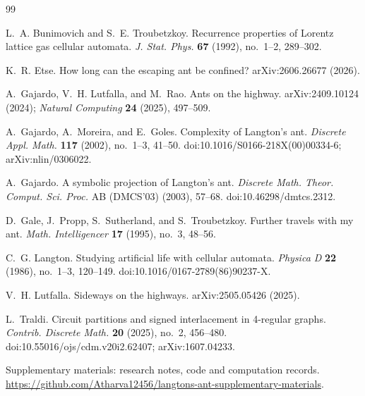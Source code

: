 \documentclass[11pt,letterpaper]{article}
\begin{document}
\begin{thebibliography}{99}

L.~A. Bunimovich and S.~E. Troubetzkoy.
\newblock Recurrence properties of {L}orentz lattice gas cellular automata.
\newblock \emph{J. Stat. Phys.} \textbf{67} (1992), no.~1--2, 289--302.

K.~R. Etse.
\newblock How long can the escaping ant be confined?
\newblock arXiv:2606.26677 (2026).

A.~Gajardo, V.~H. Lutfalla, and M.~Rao.
\newblock Ants on the highway.
\newblock arXiv:2409.10124 (2024); \emph{Natural Computing} \textbf{24} (2025), 497--509.

A.~Gajardo, A.~Moreira, and E.~Goles.
\newblock Complexity of {L}angton's ant.
\newblock \emph{Discrete Appl. Math.} \textbf{117} (2002), no.~1--3, 41--50.
\newblock doi:10.1016/S0166-218X(00)00334-6; arXiv:nlin/0306022.

A.~Gajardo.
\newblock A symbolic projection of {L}angton's ant.
\newblock \emph{Discrete Math. Theor. Comput. Sci. Proc.} AB (DMCS'03)
  (2003), 57--68.
\newblock doi:10.46298/dmtcs.2312.

D.~Gale, J.~Propp, S.~Sutherland, and S.~Troubetzkoy.
\newblock Further travels with my ant.
\newblock \emph{Math. Intelligencer} \textbf{17} (1995), no.~3, 48--56.

C.~G. Langton.
\newblock Studying artificial life with cellular automata.
\newblock \emph{Physica D} \textbf{22} (1986), no.~1--3, 120--149.
\newblock doi:10.1016/0167-2789(86)90237-X.

V.~H. Lutfalla.
\newblock Sideways on the highways.
\newblock arXiv:2505.05426 (2025).

L.~Traldi.
\newblock Circuit partitions and signed interlacement in 4-regular graphs.
\newblock \emph{Contrib. Discrete Math.} \textbf{20} (2025), no.~2, 456--480.
\newblock doi:10.55016/ojs/cdm.v20i2.62407; arXiv:1607.04233.

Supplementary materials: research notes, code and computation records.
\newblock \url{https://github.com/Atharva12456/langtons-ant-supplementary-materials}.
\end{thebibliography}
\end{document}
